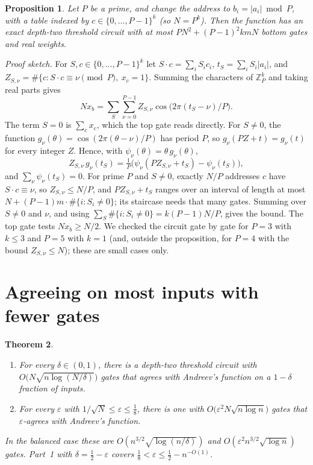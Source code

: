 \documentclass[11pt,letterpaper]{article}
\newtheorem{theorem}{Theorem}
\newtheorem{proposition}[theorem]{Proposition}
\theoremstyle{remark}
\newcommand{\sect}[1]{\section{\texorpdfstring{\color{ink}#1}{#1}}}
\begin{document}
\begin{keybox}[unbreakable,title={Generalization to other moduli (proof sketch, checked numerically on small cases, not formalized)},
  fonttitle=\bfseries\small,coltitle=ink,colbacktitle=boxbg]
\begin{proposition}\label{prop:modp}
Let $P$ be a prime, and change the address to $b_i=|a_i|\bmod P$, with a
table indexed by $c\in\{0,\dots,P-1\}^k$ (so $N=P^k$). Then the function has
an exact depth-two threshold circuit with at most $PN^2+(P-1)^2kmN$
bottom gates and real weights.
\end{proposition}
\emph{Proof sketch.} For $S,c\in\{0,\dots,P-1\}^k$ let $S\cdot c=\sum_iS_ic_i$,
$t_S=\sum_iS_i|a_i|$, and $Z_{S,\nu}=\#\{c: S\cdot c\equiv \nu \pmod P,\ x_c=1\}$.
Summing the characters of $\mathbb Z_P^k$ and taking real parts gives
\[
N x_b=\sum_{S}\sum_{\nu=0}^{P-1}Z_{S,\nu}\cos\bigl(2\pi(t_S-\nu)/P\bigr).
\]
The term $S=0$ is $\sum_cx_c$, which the top gate reads directly. For
$S\ne0$, the function $g_\nu(\theta)=\cos(2\pi(\theta-\nu)/P)$ has period $P$,
so $g_\nu(PZ+t)=g_\nu(t)$ for every integer $Z$. Hence, with
$\psi_\nu(\theta)=\theta\,g_\nu(\theta)$,
\[
Z_{S,\nu}\,g_\nu(t_S)=\tfrac1P\bigl(\psi_\nu(PZ_{S,\nu}+t_S)-\psi_\nu(t_S)\bigr),
\]
and $\sum_\nu\psi_\nu(t_S)=0$. For prime $P$ and $S\ne0$, exactly $N/P$
addresses $c$ have $S\cdot c\equiv\nu$, so $Z_{S,\nu}\le N/P$, and
$PZ_{S,\nu}+t_S$ ranges over an interval of length at most
$N+(P-1)m\cdot\#\{i:S_i\ne0\}$; its staircase needs that many gates. Summing
over $S\ne0$ and $\nu$, and using $\sum_S\#\{i:S_i\ne0\}=k(P-1)N/P$, gives the
bound. The top gate tests $Nx_b\ge N/2$. We checked the circuit gate by gate
for $P=3$ with $k\le3$ and $P=5$ with $k=1$ (and, outside the proposition,
for $P=4$ with the bound $Z_{S,\nu}\le N$); these are small cases only.
\end{keybox}

\sect{Agreeing on most inputs with fewer gates}\label{sec:avgupper}

\begin{theorem}\label{thm:avgupper}
\leavevmode
\begin{enumerate}
\item For every $\delta\in(0,1)$, there is a depth-two threshold circuit with
      $O\bigl(N\sqrt{n\log(N/\delta)}\bigr)$ gates that agrees with Andreev's
      function on a $1-\delta$ fraction of inputs.
\item For every $\varepsilon$ with $1/\sqrt N\le\varepsilon\le\tfrac18$,
      there is one with $O\bigl(\varepsilon^2N\sqrt{n\log n}\bigr)$ gates that
      $\varepsilon$-agrees with Andreev's function.
\end{enumerate}
In the balanced case these are $O(n^{3/2}\sqrt{\log(n/\delta)})$ and
$O(\varepsilon^2n^{3/2}\sqrt{\log n})$ gates. Part~1 with
$\delta=\tfrac12-\varepsilon$ covers $\tfrac18<\varepsilon\le\tfrac12-n^{-O(1)}$.
\end{theorem}
\end{document}
